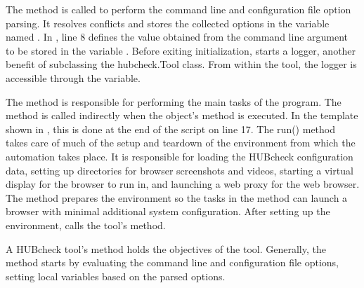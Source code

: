 

The  method is called to perform the command
line and configuration file option parsing.  It resolves conflicts and stores
the collected options in the variable named .  In
, line 8 defines the value
obtained from the  command line argument to be
stored in the variable .  Before exiting
initialization,  starts a logger,
another benefit of subclassing the hubcheck.Tool class. From within the tool,
the logger is accessible through the  variable.

The  method is responsible for performing the main tasks of
the program. The method is called indirectly when the object's 
method is executed. In the template shown in , this
is done at the end of the script on line 17.  The run() method takes care of
much of the setup and teardown of the environment from which the automation
takes place.  It is responsible for loading the HUBcheck configuration data,
setting up directories for browser screenshots and videos, starting a virtual
display for the browser to run in, and launching a web proxy for the web
browser. The  method prepares the environment so the tasks in
the  method can launch a browser with minimal additional
system configuration. After setting up the environment,  calls
the tool's  method.

A HUBcheck tool's  method holds the objectives of the tool.
Generally, the  method starts by evaluating the command
line and configuration file options, setting local variables based on the
parsed options.

